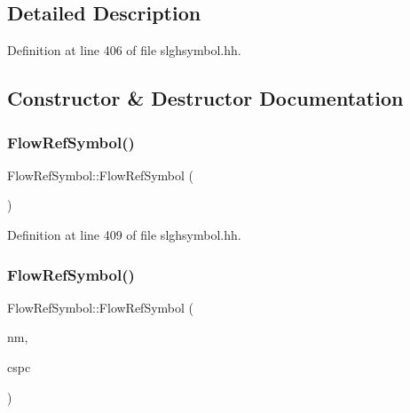\subsection{Detailed Description}


Definition at line 406 of file slghsymbol.\+hh.



\subsection{Constructor \& Destructor Documentation}
\mbox{\label{class_flow_ref_symbol_a6e08a033a20d06bfc3a22adaff69db96}} 
\subsubsection{\texorpdfstring{FlowRefSymbol()}{FlowRefSymbol()}\hspace{0.1cm}{\footnotesize\ttfamily [1/2]}}
{\footnotesize\ttfamily Flow\+Ref\+Symbol\+::\+Flow\+Ref\+Symbol (\begin{DoxyParamCaption}\item[{void}]{ }\end{DoxyParamCaption})\hspace{0.3cm}{\ttfamily [inline]}}



Definition at line 409 of file slghsymbol.\+hh.

\mbox{\label{class_flow_ref_symbol_a5330aba4060d38db2fff04d475a039fd}} 
\subsubsection{\texorpdfstring{FlowRefSymbol()}{FlowRefSymbol()}\hspace{0.1cm}{\footnotesize\ttfamily [2/2]}}
{\footnotesize\ttfamily Flow\+Ref\+Symbol\+::\+Flow\+Ref\+Symbol (\begin{DoxyParamCaption}\item[{const string \&}]{nm,  }\item[{\mbox{\hyperlink{class_addr_space}{Addr\+Space}} $\ast$}]{cspc }\end{DoxyParamCaption})}



